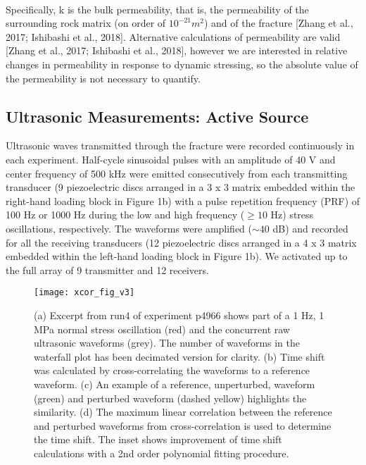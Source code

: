 \paragraph{} Specifically, k is the bulk permeability, that is, the permeability of the surrounding rock matrix (on order of $10^{-21} m^2$) and of the fracture [Zhang et al., 2017; Ishibashi et al., 2018]. Alternative calculations of permeability are valid [Zhang et al., 2017; Ishibashi et al., 2018], however we are interested in relative changes in permeability in response to dynamic stressing, so the absolute value of the permeability is not necessary to quantify.


\subsection{Ultrasonic Measurements: Active Source}
Ultrasonic waves transmitted through the fracture were recorded continuously in each experiment. Half-cycle sinusoidal pulses with an amplitude of 40 V and center frequency of 500 kHz were emitted consecutively from each transmitting transducer (9 piezoelectric discs arranged in a 3 x 3 matrix embedded within the right-hand loading block in Figure 1b) with a pulse repetition frequency (PRF) of 100 Hz or 1000 Hz during the low and high frequency ($\geq 10$ Hz) stress oscillations, respectively. The waveforms were amplified ($\sim 40$ dB) and recorded for all the receiving transducers (12 piezoelectric discs arranged in a 4 x 3 matrix embedded within the left-hand loading block in Figure 1b). We activated up to the full array of 9 transmitter and 12 receivers. 

\newpage

\begin{figure*}[ht]
	\centering
	\texttt{[image: xcor\_fig\_v3]}
	\caption[]{(a) Excerpt from run4 of experiment p4966 shows part of a 1 Hz, 1 MPa normal stress oscillation (red) and the concurrent raw ultrasonic waveforms (grey). The number of waveforms in the waterfall plot has been decimated version for clarity. (b) Time shift was calculated by cross-correlating the waveforms to a reference waveform. (c) An example of a reference, unperturbed, waveform (green) and perturbed waveform (dashed yellow) highlights
		the similarity. (d) The maximum linear correlation between the reference and perturbed waveforms from cross-correlation is used to determine the time shift. The inset shows improvement of time shift calculations with a 2nd order polynomial fitting procedure.}
	\label{fig:xcor_poly}
\end{figure*}

\newpage